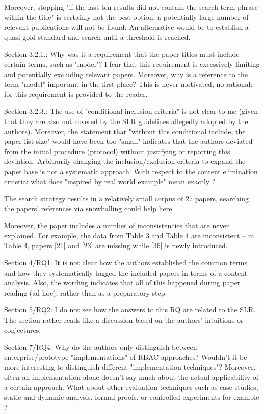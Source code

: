 Moreover, stopping "if the last ten results did not contain the search
term phrase within the title" is certainly not the best option: a
potentially large number of relevant publications will not be found.
An alternative would be to establish a quasi-gold standard and search
until a threshold is reached.

Section 3.2.1.: Why was it a requirement that the paper titles must
include certain terms, such as "model"?  I fear that this requirement
is excessively limiting and potentially excluding relevant papers.
Moreover, why is a reference to the term "model" important in the
first place? This is never motivated, no rationale for this
requirement is provided to the reader.

Section 3.2.3.: The use of "conditional inclusion criteria" is not
clear to me (given that they are also not covered by the SLR
guidelines allegedly adopted by the authors). Moreover, the statement
that "without this conditional include, the paper list size" would
have been too "small" indicates that the authors deviated from the
initial procedure (protocol) without justifying or reporting this
deviation.  Arbitrarily changing the inclusion/exclusion criteria to
expand the paper base is not a systematic approach.  With respect to
the content elimination criteria: what does "inspired by real world
example" mean exactly ?

The search strategy results in a relatively small corpus of 27 papers,
searching the papers' references via snowballing could help here.

Moreover, the paper includes a number of inconsistencies that are
never explained. For example, the data from Table 3 and Table 4 are
inconsistent -- in Table 4, papers [21] and [23] are missing while [36]
is newly introduced.

Section 4/RQ1: It is not clear how the authors established the common
terms and how they systematically tagged the included papers in terms
of a content analysis. Also, the wording indicates that all of this
happened during paper reading (ad hoc), rather than as a preparatory
step.

Section 5/RQ2: I do not see how the answers to this RQ are related to
the SLR. The section rather reads like a discussion based on the
authors' intuitions or conjectures.

Section 7/RQ4: Why do the authors only distinguish between
enterprise/prototype "implementations" of RBAC approaches? Wouldn't
it be more interesting to distinguish different "implementation
techniques"?  Moreover, often an implementation alone doesn't say much
about the actual applicability of a certain approach. What about other
evaluation techniques such as case studies, static and dynamic
analysis, formal proofs, or controlled experiments for example ?

